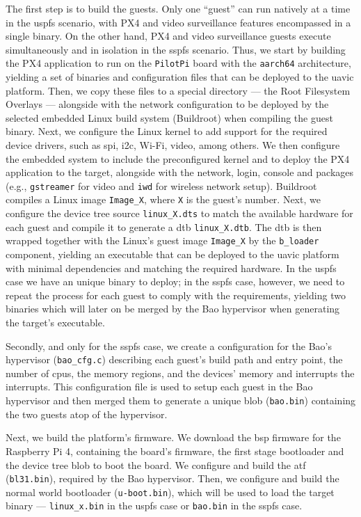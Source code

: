 The first step is to build the guests. Only one ``guest'' can run natively at a
time in the \gls{uspfs} scenario, with
PX4 and video surveillance features encompassed in a single binary. On the other
hand, PX4 and video surveillance guests execute simultaneously and in isolation
in the \gls{sspfs} scenario. Thus, we start by building the PX4 application to
run on the \texttt{PilotPi} board with the \texttt{aarch64} architecture,
yielding a set of binaries and configuration files that can be deployed to the
\gls{uavic} platform. Then, we copy these files to a special directory --- the
Root Filesystem Overlays --- alongside with the network configuration to be
deployed by the selected embedded Linux build system (Buildroot) when compiling
the guest binary.
Next, we configure the Linux kernel to add support for the required device
drivers, such as \gls{spi}, \gls{i2c}, Wi-Fi, video, among others. We then
configure the embedded system to include the preconfigured kernel and to deploy
the PX4 application to the target, alongside with the network, login, console
and packages (e.g., \texttt{gstreamer} for video and \texttt{iwd} for wireless
network setup). Buildroot compiles a Linux image \texttt{Image\_X}, where
\texttt{X} is the guest's number. Next, we configure the device tree source \texttt{linux\_X.dts} to
match the available hardware for each guest and compile it to generate a \gls{dtb} \texttt{linux\_X.dtb}. The \gls{dtb} is then wrapped together
with the Linux's guest image \texttt{Image\_X} by the \texttt{b\_loader}
component, yielding an executable that can be deployed to the \gls{uavic}
platform with minimal dependencies and matching the required hardware. In the
\gls{uspfs} case we have an unique binary to deploy; in the \gls{sspfs} case,
however, we need to repeat the process for each guest to comply with the
requirements, yielding two binaries which will later on be merged by the Bao
hypervisor when generating the target's executable.

Secondly, and only for the \gls{sspfs} case, we create a configuration for the
Bao's hypervisor (\texttt{bao\_cfg.c}) describing each guest's build path
and entry point, the number 
of \glspl{cpu}, the memory regions, and the devices' memory and interrupts the
interrupts. This configuration file is used to setup each guest in the Bao
hypervisor and then merged them to generate a unique blob (\texttt{bao.bin}) containing the two guests atop of the hypervisor.

Next, we build the platform's firmware. We download the \gls{bsp} firmware for
the Raspberry Pi 4, containing the board's firmware, the first stage bootloader
and the device tree blob to boot the board. We configure and build the
\gls{atf} (\texttt{bl31.bin}), required by the Bao hypervisor. Then, we
configure and build the normal world bootloader (\texttt{u-boot.bin}), which
will be used to load the target binary --- \texttt{linux\_x.bin} in the
\gls{uspfs} case or \texttt{bao.bin} in the \gls{sspfs} case.

